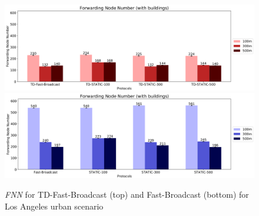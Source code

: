 		\begin{figure}[H]
			\centering
			\includegraphics[width=1.0\textwidth]{immagini/td-fb-la/td-fb/fnn}	
			\includegraphics[width=1.0\textwidth]{immagini/td-fb-la/fb/fnn}
			\caption{\textit{FNN} for TD-Fast-Broadcast (top) and Fast-Broadcast (bottom) for Los Angeles urban scenario}
				\label{fig:la-td-fnn}
		\end{figure}
		